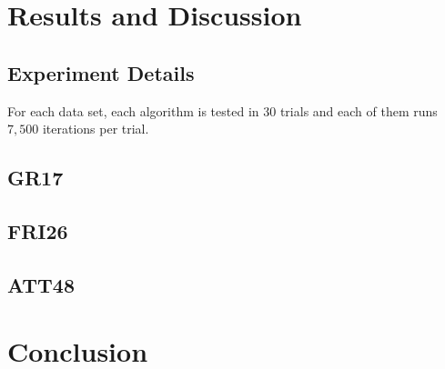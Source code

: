\documentclass{article}
\begin{document}
\section{Results and Discussion}

\subsection{Experiment Details}

For each data set, each algorithm is tested in \(30\) trials and each of them runs \(7,500\) iterations per trial.

\subsection{GR17}



\subsection{FRI26}



\subsection{ATT48}



\section{Conclusion}
\end{document}
